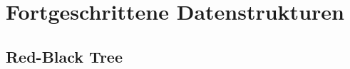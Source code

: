\documentclass[
../../AuD-Zusammenfassung.tex,
]
{subfiles}
\begin{document}
\section{Fortgeschrittene Datenstrukturen}
\subsection{Red-Black Tree}







\end{document}
